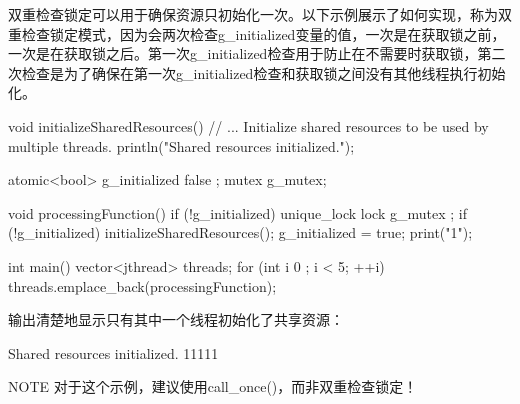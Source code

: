双重检查锁定可以用于确保资源只初始化一次。以下示例展示了如何实现，称为双重检查锁定模式，因为会两次检查g\_initialized变量的值，一次是在获取锁之前，一次是在获取锁之后。第一次g\_initialized检查用于防止在不需要时获取锁，第二次检查是为了确保在第一次g\_initialized检查和获取锁之间没有其他线程执行初始化。

\begin{cpp}
void initializeSharedResources()
{
    // ... Initialize shared resources to be used by multiple threads.
    println("Shared resources initialized.");
}

atomic<bool> g_initialized { false };
mutex g_mutex;

void processingFunction()
{
    if (!g_initialized) {
        unique_lock lock { g_mutex };
        if (!g_initialized) {
            initializeSharedResources();
            g_initialized = true;
        }
    }
    print("1");
}

int main()
{
    vector<jthread> threads;
    for (int i { 0 }; i < 5; ++i) {
        threads.emplace_back(processingFunction);
    }
}
\end{cpp}

输出清楚地显示只有其中一个线程初始化了共享资源：

\begin{shell}
Shared resources initialized.
11111
\end{shell}


\begin{myNotic}{NOTE}
对于这个示例，建议使用call\_once()，而非双重检查锁定！
\end{myNotic}





